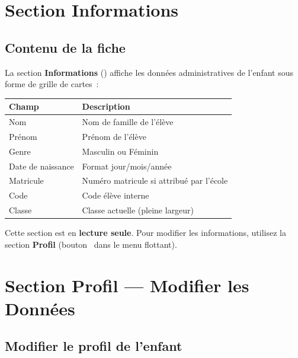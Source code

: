 
\newpage
\chapter{Section Informations}

\section{Contenu de la fiche}

La section \textbf{Informations} (\faIdCard) affiche les donn\'ees administratives de l'enfant sous forme de grille de cartes~:

\begin{center}
\begin{tabularx}{\textwidth}{lX}
\toprule
\textbf{Champ} & \textbf{Description} \\
\midrule
Nom & Nom de famille de l'\'el\`eve \\
Pr\'enom & Pr\'enom de l'\'el\`eve \\
Genre & Masculin ou F\'eminin \\
Date de naissance & Format jour/mois/ann\'ee \\
Matricule & Num\'ero matricule si attribu\'e par l'\'ecole \\
Code & Code \'el\`eve interne \\
Classe & Classe actuelle (pleine largeur) \\
\bottomrule
\end{tabularx}
\end{center}

\begin{info}
Cette section est en \textbf{lecture seule}. Pour modifier les informations, utilisez la section \textbf{Profil} (bouton \faUserEdit\ dans le menu flottant).
\end{info}

\newpage
\chapter{Section Profil --- Modifier les Donn\'ees}

\section{Modifier le profil de l'enfant}

